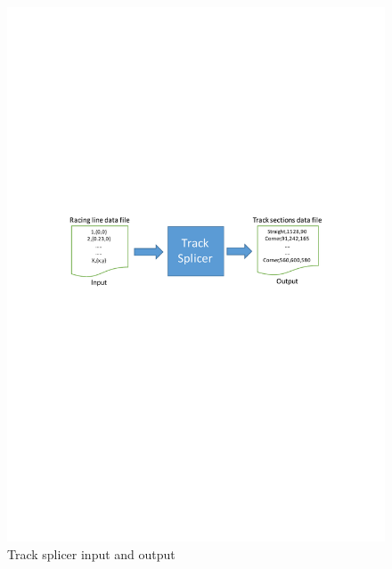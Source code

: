 \begin{figure}[!htb]
	\centering
	\includegraphics[width=\textwidth]{diagrams/trackspliceinputoutput.pdf}
	\caption[Track splicer input and out]{Track splicer input and output}
	\label{fig:diagram-trackspliceinputoutput}
\end{figure}

